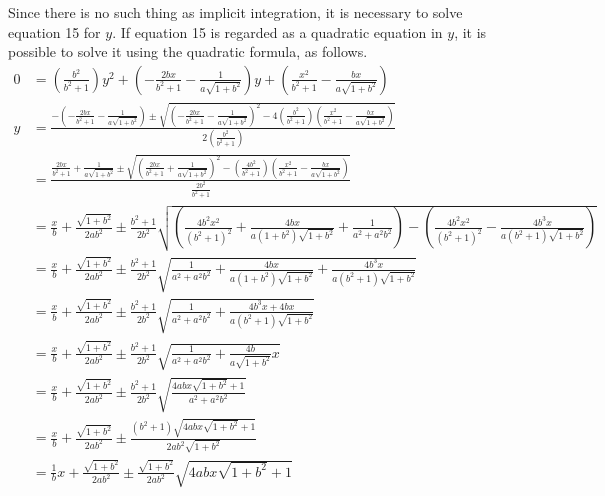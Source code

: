 \documentclass{article}
\begin{document}
Since there is no such thing as implicit integration, it is necessary to solve equation 15 for $y$. If equation 15 is regarded as a quadratic equation in $y$, it is possible to solve it using the quadratic formula, as follows.
\begin{align*}
0 &= \left(\frac{b^2}{b^2+1}\right)y^2+\left(-\frac{2bx}{b^2+1}-\frac{1}{a\sqrt{1+b^2}}\right)y+\left(\frac{x^2}{b^2+1}-\frac{bx}{a\sqrt{1+b^2}}\right)\\
y &= \frac{-\left(-\frac{2bx}{b^2+1}-\frac{1}{a\sqrt{1+b^2}}\right)\pm\sqrt{\left(-\frac{2bx}{b^2+1}-\frac{1}{a\sqrt{1+b^2}}\right)^2-4\left(\frac{b^2}{b^2+1}\right)\left(\frac{x^2}{b^2+1}-\frac{bx}{a\sqrt{1+b^2}}\right)}}{2\left(\frac{b^2}{b^2+1}\right)}\\
   &= \frac{\frac{2bx}{b^2+1}+\frac{1}{a\sqrt{1+b^2}}\pm\sqrt{\left(\frac{2bx}{b^2+1}+\frac{1}{a\sqrt{1+b^2}}\right)^2-\left(\frac{4b^2}{b^2+1}\right)\left(\frac{x^2}{b^2+1}-\frac{bx}{a\sqrt{1+b^2}}\right)}}{\frac{2b^2}{b^2+1}}\\
   &= \frac{x}{b}+\frac{\sqrt{1+b^2}}{2ab^2}\pm\frac{b^2+1}{2b^2}\sqrt{\left(\frac{4b^2x^2}{(b^2+1)^2}+\frac{4bx}{a(1+b^2)\sqrt{1+b^2}}+\frac{1}{a^2+a^2b^2}\right)-\left(\frac{4b^2x^2}{(b^2+1)^2}-\frac{4b^3x}{a(b^2+1)\sqrt{1+b^2}}\right)}\\
   &= \frac{x}{b}+\frac{\sqrt{1+b^2}}{2ab^2}\pm\frac{b^2+1}{2b^2}\sqrt{\frac{1}{a^2+a^2b^2}+\frac{4bx}{a(1+b^2)\sqrt{1+b^2}}+\frac{4b^3x}{a(b^2+1)\sqrt{1+b^2}}}\\
   &= \frac{x}{b}+\frac{\sqrt{1+b^2}}{2ab^2}\pm\frac{b^2+1}{2b^2}\sqrt{\frac{1}{a^2+a^2b^2}+\frac{4b^3x+4bx}{a(b^2+1)\sqrt{1+b^2}}}\\
   &= \frac{x}{b}+\frac{\sqrt{1+b^2}}{2ab^2}\pm\frac{b^2+1}{2b^2}\sqrt{\frac{1}{a^2+a^2b^2}+\frac{4b}{a\sqrt{1+b^2}}x}\\
   &= \frac{x}{b}+\frac{\sqrt{1+b^2}}{2ab^2}\pm\frac{b^2+1}{2b^2}\sqrt{\frac{4abx\sqrt{1+b^2}+1}{a^2+a^2b^2}}\\
   &= \frac{x}{b}+\frac{\sqrt{1+b^2}}{2ab^2}\pm\frac{(b^2+1)\sqrt{4abx\sqrt{1+b^2}+1}}{2ab^2\sqrt{1+b^2}}\\
   &= \frac{1}{b}x+\frac{\sqrt{1+b^2}}{2ab^2}\pm\frac{\sqrt{1+b^2}}{2ab^2}\sqrt{4abx\sqrt{1+b^2}+1}
\end{align*}
\end{document}

